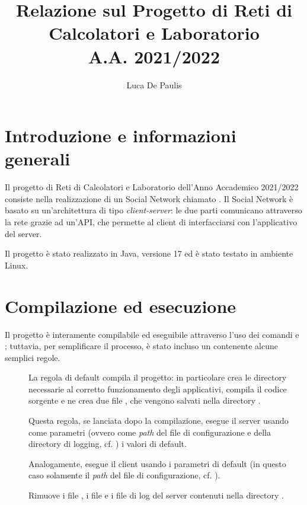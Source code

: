 \documentclass[
    oneside,
    10pt,
    language=italian,
    a4paper,
    article
]{notes}
\author{Luca De Paulis}
\title{Relazione sul Progetto di Reti di Calcolatori e Laboratorio \\
    \large A.A. 2021/2022 }
\begin{document}
\maketitle

\section{Introduzione e informazioni generali}
Il progetto di Reti di Calcolatori e Laboratorio dell'Anno Accademico 2021/2022
consiste nella realizzazione di un Social Network chiamato .
Il Social Network è basato su un'architettura di tipo \emph{client-server}:
le due parti comunicano attraverso la rete grazie ad un'API, che permette
al client di interfacciarsi con l'applicativo del server.

Il progetto è stato realizzato in Java, versione 17 ed è stato testato in ambiente
Linux.

\section{Compilazione ed esecuzione}
Il progetto è interamente compilabile ed eseguibile attraverso l'uso dei comandi
 e ; tuttavia, per semplificare il processo, è stato
incluso un  contenente alcune semplici regole.
\begin{description}
    \item[] La regola di default compila il progetto: in particolare 
        crea le directory necessarie al corretto funzionamento degli applicativi,
        compila il codice sorgente e ne crea due file , che vengono
        salvati nella directory .
    \item[] Questa regola, se lanciata dopo la
        compilazione, esegue il server usando come parametri (ovvero come 
        \emph{path} del file di configurazione e della directory di logging, 
        cf. ) i valori di default.
    \item[] Analogamente, esegue il client usando
        i parametri di default (in questo caso solamente il \emph{path} del
        file di configurazione, cf. ).  
    \item[] Rimuove i file , i file 
        e i file di log del server contenuti nella directory . 
\end{description}
\end{document}
